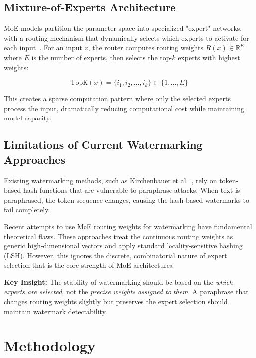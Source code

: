 \subsection{Mixture-of-Experts Architecture}

MoE models partition the parameter space into specialized "expert" networks, with a routing mechanism that dynamically selects which experts to activate for each input~\cite{shazeer2017outrageously}. For an input $x$, the router computes routing weights $R(x) \in \mathbb{R}^E$ where $E$ is the number of experts, then selects the top-$k$ experts with highest weights:

\begin{equation}
\text{TopK}(x) = \{i_1, i_2, \ldots, i_k\} \subset \{1, \ldots, E\}
\end{equation}

This creates a sparse computation pattern where only the selected experts process the input, dramatically reducing computational cost while maintaining model capacity.

\subsection{Limitations of Current Watermarking Approaches}

Existing watermarking methods, such as Kirchenbauer et al.~\cite{kirchenbauer2023watermark}, rely on token-based hash functions that are vulnerable to paraphrase attacks. When text is paraphrased, the token sequence changes, causing the hash-based watermarks to fail completely.

Recent attempts to use MoE routing weights for watermarking have fundamental theoretical flaws. These approaches treat the continuous routing weights as generic high-dimensional vectors and apply standard locality-sensitive hashing (LSH). However, this ignores the discrete, combinatorial nature of expert selection that is the core strength of MoE architectures.

\textbf{Key Insight:} The stability of watermarking should be based on the \textit{which experts are selected}, not the \textit{precise weights assigned to them}. A paraphrase that changes routing weights slightly but preserves the expert selection should maintain watermark detectability.

\section{Methodology}

